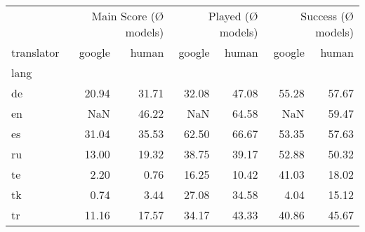 \begin{tabular}{lrrrrrr}
\toprule
 & \multicolumn{2}{r}{Main Score (Ø models)} & \multicolumn{2}{r}{Played (Ø models)} & \multicolumn{2}{r}{Success (Ø models)} \\
translator & google & human & google & human & google & human \\
lang &  &  &  &  &  &  \\
\midrule
de & 20.94 & 31.71 & 32.08 & 47.08 & 55.28 & 57.67 \\
en & NaN & 46.22 & NaN & 64.58 & NaN & 59.47 \\
es & 31.04 & 35.53 & 62.50 & 66.67 & 53.35 & 57.63 \\
ru & 13.00 & 19.32 & 38.75 & 39.17 & 52.88 & 50.32 \\
te & 2.20 & 0.76 & 16.25 & 10.42 & 41.03 & 18.02 \\
tk & 0.74 & 3.44 & 27.08 & 34.58 & 4.04 & 15.12 \\
tr & 11.16 & 17.57 & 34.17 & 43.33 & 40.86 & 45.67 \\
\bottomrule
\end{tabular}
